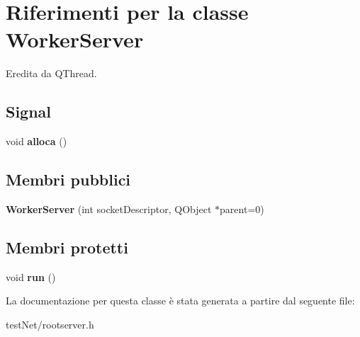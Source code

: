 \hypertarget{class_worker_server}{\section{Riferimenti per la classe Worker\-Server}
\label{class_worker_server}
}


Eredita da Q\-Thread.

\subsection*{Signal}
\begin{DoxyCompactItemize}
\item 
\hypertarget{class_worker_server_a0ba45f59bc12f31cc2adbe8d0d71df32}{void {\bfseries alloca} ()}\label{class_worker_server_a0ba45f59bc12f31cc2adbe8d0d71df32}

\end{DoxyCompactItemize}
\subsection*{Membri pubblici}
\begin{DoxyCompactItemize}
\item 
\hypertarget{class_worker_server_ac81965042a951a11e282d55aa11bf2bc}{{\bfseries Worker\-Server} (int socket\-Descriptor, Q\-Object $\ast$parent=0)}\label{class_worker_server_ac81965042a951a11e282d55aa11bf2bc}

\end{DoxyCompactItemize}
\subsection*{Membri protetti}
\begin{DoxyCompactItemize}
\item 
\hypertarget{class_worker_server_a828583ef200eadb6c90a9af0054c48e0}{void {\bfseries run} ()}\label{class_worker_server_a828583ef200eadb6c90a9af0054c48e0}

\end{DoxyCompactItemize}


La documentazione per questa classe è stata generata a partire dal seguente file\-:\begin{DoxyCompactItemize}
\item 
test\-Net/rootserver.\-h\end{DoxyCompactItemize}
